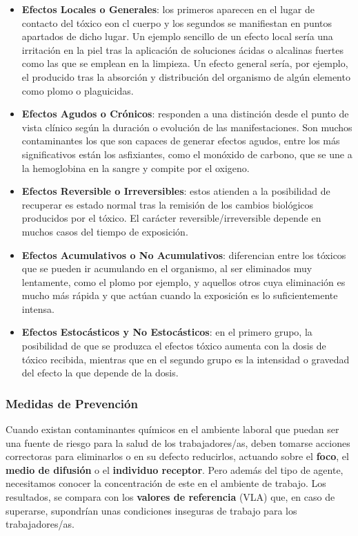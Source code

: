 \begin{itemize}
    \item \textbf{Efectos Locales o Generales}: los primeros aparecen en el lugar de contacto del tóxico eon cl cuerpo y los segundos se manifiestan en puntos apartados de dicho lugar. Un ejemplo sencillo de un efecto local sería una irritación en la piel tras la aplicación de soluciones ácidas o alcalinas fuertes como las que se emplean en la limpieza. Un efecto general sería, por ejemplo, el producido tras la absorción y distribución del organismo de algún elemento como plomo o plaguicidas.

    \item \textbf{Efectos Agudos o Crónicos}: responden a una distinción desde el punto de vista clínico según la duración o evolución de las manifestaciones. Son muchos contaminantes los que son capaces de generar efectos agudos, entre los más significativos están los asfixiantes, como el monóxido de carbono, que se une a la hemoglobina en la sangre y compite por el oxigeno.

    \item \textbf{Efectos Reversible o Irreversibles}: estos atienden a la posibilidad de recuperar es estado normal tras la remisión de los cambios biológicos producidos por el tóxico. El carácter reversible/irreversible depende en muchos casos del tiempo de exposición.

    \item \textbf{Efectos Acumulativos o No Acumulativos}: diferencian entre los tóxicos que se pueden ir acumulando en el organismo, al ser eliminados muy lentamente, como el plomo por ejemplo, y aquellos otros cuya eliminación es mucho más rápida y que actúan cuando la exposición es lo suficientemente intensa.

    \item \textbf{Efectos Estocásticos y No Estocásticos}: en el primero grupo, la posibilidad de que se produzca el efectos tóxico aumenta con la dosis de tóxico recibida, mientras que en el segundo grupo es la intensidad o gravedad del efecto la que depende de la dosis.
\end{itemize}

\subsubsection{Medidas de Prevención}
Cuando existan contaminantes químicos en el ambiente laboral que puedan ser una fuente de riesgo para la salud de los trabajadores/as, deben tomarse acciones correctoras para eliminarlos o en su defecto reducirlos, actuando sobre el \textbf{foco}, el \textbf{medio de difusión} o el \textbf{individuo receptor}. Pero además del tipo de agente, necesitamos conocer la concentración de este en el ambiente de trabajo. Los resultados, se compara con los \textbf{valores de referencia} (VLA) que, en caso de superarse, supondrían unas condiciones inseguras de trabajo para los trabajadores/as.

